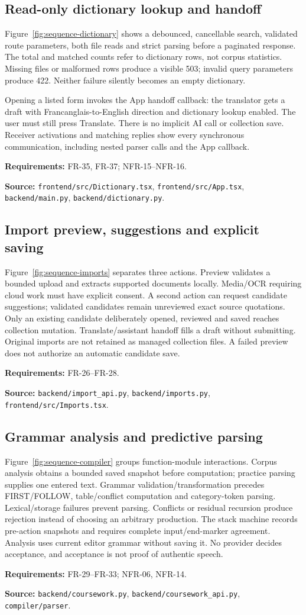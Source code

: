 \documentclass[11pt,a4paper]{article}
\newcommand{\viewtrace}[2]{\par\smallskip\noindent\textbf{Requirements:} #1.\par
  \noindent\textbf{Source:} #2.\par\medskip}
\begin{document}
\subsection{Read-only dictionary lookup and handoff}
Figure~\ref{fig:sequence-dictionary} shows a debounced, cancellable search,
validated route parameters, both file reads and strict parsing before a
paginated response. The total and matched counts refer to dictionary rows,
not corpus statistics. Missing files or malformed rows produce a visible 503;
invalid query parameters produce 422. Neither failure silently becomes an
empty dictionary.

Opening a listed form invokes the App handoff callback: the translator gets
a draft with Francanglais-to-English direction and dictionary lookup enabled.
The user must still press Translate. There is no implicit AI call or collection
save. Receiver activations and matching replies show every synchronous
communication, including nested parser calls and the App callback.
\viewtrace{FR-35, FR-37; NFR-15--NFR-16}
{\nolinkurl{frontend/src/Dictionary.tsx}, \nolinkurl{frontend/src/App.tsx},
\nolinkurl{backend/main.py}, \nolinkurl{backend/dictionary.py}}

\subsection{Import preview, suggestions and explicit saving}
Figure~\ref{fig:sequence-imports} separates three actions. Preview validates a
bounded upload and extracts supported documents locally. Media/OCR requiring
cloud work must have explicit consent. A second action can request candidate
suggestions; validated candidates remain unreviewed exact source quotations.
Only an existing candidate deliberately opened, reviewed and saved reaches
collection mutation. Translate/assistant handoff fills a draft without submitting.
Original imports are not retained as managed collection files. A failed preview
does not authorize an automatic candidate save.
\viewtrace{FR-26--FR-28}{\nolinkurl{backend/import_api.py}, \nolinkurl{backend/imports.py}, \nolinkurl{frontend/src/Imports.tsx}}

\subsection{Grammar analysis and predictive parsing}
Figure~\ref{fig:sequence-compiler} groups function-module interactions.
Corpus analysis obtains a bounded saved snapshot before computation; practice
parsing supplies one entered text. Grammar validation/transformation precedes
FIRST/FOLLOW, table/conflict computation and category-token parsing.
Lexical/storage failures prevent parsing. Conflicts or residual recursion
produce rejection instead of choosing an arbitrary production. The stack
machine records pre-action snapshots and requires complete input/end-marker
agreement. Analysis uses current editor grammar without saving it. No provider
decides acceptance, and acceptance is not proof of authentic speech.
\viewtrace{FR-29--FR-33; NFR-06, NFR-14}
{\nolinkurl{backend/coursework.py}, \nolinkurl{backend/coursework_api.py}, \nolinkurl{compiler/parser}}
\end{document}
